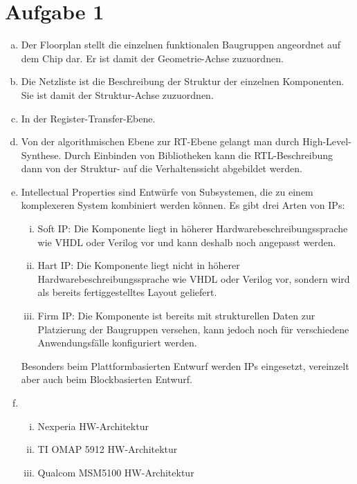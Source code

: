 \documentclass[a4paper]{scrartcl}
\begin{document}
	
	\section*{Aufgabe 1}
	
	\begin{enumerate}[(a)]
		\item Der Floorplan stellt die einzelnen funktionalen Baugruppen angeordnet auf dem Chip dar. Er ist damit der Geometrie-Achse zuzuordnen.
		\item Die Netzliste ist die Beschreibung der Struktur der einzelnen Komponenten. Sie ist damit der Struktur-Achse zuzuordnen.
		\item In der Register-Transfer-Ebene.
		\item Von der algorithmischen Ebene zur RT-Ebene gelangt man durch High-Level-Synthese. Durch Einbinden von Bibliotheken kann die RTL-Beschreibung dann von der Struktur- auf die Verhaltenssicht abgebildet werden.
		\item Intellectual Properties sind Entwürfe von Subsystemen, die zu einem komplexeren System kombiniert werden können. 
		Es gibt drei Arten von IPs:
		
		\begin{enumerate}[i.]
			\item Soft IP: Die Komponente liegt in höherer Hardwarebeschreibungssprache wie VHDL oder Verilog vor und kann deshalb noch angepasst werden.
			\item Hart IP: Die Komponente liegt nicht in höherer Hardwarebeschreibungssprache wie VHDL oder Verilog vor, sondern wird als bereits fertiggestelltes Layout geliefert.
			\item Firm IP:  Die Komponente ist bereits mit strukturellen Daten zur Platzierung der Baugruppen versehen, kann jedoch noch für verschiedene Anwendungsfälle konfiguriert werden. 
		\end{enumerate}		
				
		Besonders beim Plattformbasierten Entwurf werden IPs eingesetzt, vereinzelt aber auch beim Blockbasierten Entwurf.
		\item \hfil
		
		\begin{enumerate}[i.]
			\item Nexperia HW-Architektur
			\item TI OMAP 5912 HW-Architektur
			\item Qualcom MSM5100 HW-Architektur
		\end{enumerate}
	\end{enumerate}

	
\end{document}
